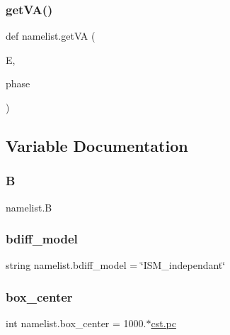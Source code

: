 \mbox{\label{namespacenamelist_a46cfef786541cc5937eba1e0cda48f31}} 
\subsubsection{\texorpdfstring{get\+V\+A()}{getVA()}}
{\footnotesize\ttfamily def namelist.\+get\+VA (\begin{DoxyParamCaption}\item[{}]{E,  }\item[{}]{phase }\end{DoxyParamCaption})}



\subsection{Variable Documentation}
\mbox{\label{namespacenamelist_a48ab86f6cb5d4c6de82427283c61ed93}} 
\subsubsection{\texorpdfstring{B}{B}}
{\footnotesize\ttfamily namelist.\+B}

\mbox{\label{namespacenamelist_ac444a9ea5d6ffb31f9fa075f27b1f226}} 
\subsubsection{\texorpdfstring{bdiff\+\_\+model}{bdiff\_model}}
{\footnotesize\ttfamily string namelist.\+bdiff\+\_\+model = \char`\"{}I\+S\+M\+\_\+independant\char`\"{}}

\mbox{\label{namespacenamelist_a364797b64f69de89c19410bc987ce594}} 
\subsubsection{\texorpdfstring{box\+\_\+center}{box\_center}}
{\footnotesize\ttfamily int namelist.\+box\+\_\+center = 1000.$\ast$\hyperlink{constants_8h_a2884cd030c4c825754349a525a1d06ce}{cst.\+pc}}

